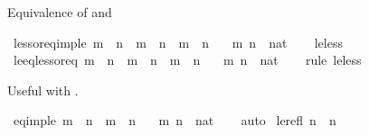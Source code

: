 \begin{isabellebody}
\begin{isamarkuptext}
Equivalence of  and %
\end{isamarkuptext}\isamarkuptrue%
\isamarkupfalse%
\ less{\isacharunderscore}{\kern0pt}or{\isacharunderscore}{\kern0pt}eq{\isacharunderscore}{\kern0pt}imp{\isacharunderscore}{\kern0pt}le{\isacharcolon}{\kern0pt}\ {\isachardoublequoteopen}m\ {\isacharless}{\kern0pt}\ n\ {\isasymor}\ m\ {\isacharequal}{\kern0pt}\ n\ {\isasymLongrightarrow}\ m\ {\isasymle}\ n{\isachardoublequoteclose}\isanewline
\ \ \ m\ n\ {\isacharcolon}{\kern0pt}{\isacharcolon}{\kern0pt}\ nat\isanewline
%
\isadelimproof
\ \ %
\endisadelimproof
%
\isatagproof
{}\isamarkupfalse%
\ le{\isacharunderscore}{\kern0pt}less\ \isacommand{{\isachardot}{\kern0pt}}\isamarkupfalse%
%
\endisatagproof
{\isafoldproof}%
%
\isadelimproof
\isanewline
%
\endisadelimproof
\isanewline
{}\isamarkupfalse%
\ le{\isacharunderscore}{\kern0pt}eq{\isacharunderscore}{\kern0pt}less{\isacharunderscore}{\kern0pt}or{\isacharunderscore}{\kern0pt}eq{\isacharcolon}{\kern0pt}\ {\isachardoublequoteopen}m\ {\isasymle}\ n\ {\isasymlongleftrightarrow}\ m\ {\isacharless}{\kern0pt}\ n\ {\isasymor}\ m\ {\isacharequal}{\kern0pt}\ n{\isachardoublequoteclose}\isanewline
\ \ \ m\ n\ {\isacharcolon}{\kern0pt}{\isacharcolon}{\kern0pt}\ nat\isanewline
%
\isadelimproof
\ \ %
\endisadelimproof
%
\isatagproof
{}\isamarkupfalse%
\ {\isacharparenleft}{\kern0pt}rule\ le{\isacharunderscore}{\kern0pt}less{\isacharparenright}{\kern0pt}%
\endisatagproof
{\isafoldproof}%
%
\isadelimproof
%
\endisadelimproof
%
\begin{isamarkuptext}%
Useful with .%
\end{isamarkuptext}\isamarkuptrue%
\isamarkupfalse%
\ eq{\isacharunderscore}{\kern0pt}imp{\isacharunderscore}{\kern0pt}le{\isacharcolon}{\kern0pt}\ {\isachardoublequoteopen}m\ {\isacharequal}{\kern0pt}\ n\ {\isasymLongrightarrow}\ m\ {\isasymle}\ n{\isachardoublequoteclose}\isanewline
\ \ \ m\ n\ {\isacharcolon}{\kern0pt}{\isacharcolon}{\kern0pt}\ nat\isanewline
%
\isadelimproof
\ \ %
\endisadelimproof
%
\isatagproof
{}\isamarkupfalse%
\ auto%
\endisatagproof
{\isafoldproof}%
%
\isadelimproof
\isanewline
%
\endisadelimproof
\isanewline
{}\isamarkupfalse%
\ le{\isacharunderscore}{\kern0pt}refl{\isacharcolon}{\kern0pt}\ {\isachardoublequoteopen}n\ {\isasymle}\ n{\isachardoublequoteclose}\isanewline

\end{isabellebody}
